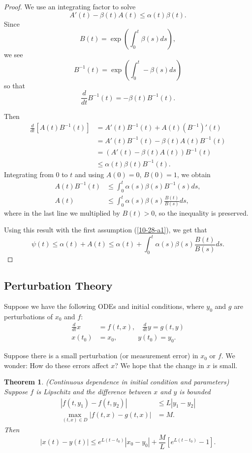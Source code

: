 \documentclass{tufte-handout}
\newtheorem{thm}{Theorem}[subsection]
\theoremstyle{definition}
\begin{document}
\begin{proof}
	We use an integrating factor to solve
	\[
		A'(t) - \beta(t) A(t) \le \alpha(t)\beta(t).
	\]
	Since \[
		B(t) = \exp\left(\int_{0}^{t} \beta(s)ds\right) 
	,\] we see
	\[
		B^{-1}(t) = \exp\left( \int_{0}^{t} -\beta(s)ds \right)
	\]
	so that
	\[
		\frac{d}{dt} B^{-1}(t) = -\beta(t) B^{-1}(t).
	\]

	Then
	\begin{align*}
		\frac{d}{dt}\left[ A(t) B^{-1}(t) \right]
			&= A'(t) B^{-1}(t) + A(t)\left( B^{-1} \right)'(t) \\
			&= A'(t) B^{-1}(t) - \beta(t) A(t) B^{-1}(t) \\
			&= \left( A'(t) - \beta(t) A(t) \right) B^{-1}(t) \\
			&\le \alpha(t)\beta(t) B^{-1}(t).
	\end{align*}
	Integrating from $0$ to $t$ and using $A(0) = 0$, $B(0) = 1$, we obtain 
	\begin{align*}
		A(t) B^{-1}(t)
			&\le \int_{0}^{t} \alpha(s)\beta(s) B^{-1}(s)ds, \\
		A(t)
			&\le \int_{0}^{t} \alpha(s)\beta(s) \frac{B(t)}{B(s)}ds,
	\end{align*}
	where in the last line we multiplied by $B(t) > 0$, so the inequality is preserved.

	Using this result with the first assumption (\ref{10-28-a1}), we get that \[
		\psi(t) \le \alpha(t) + A(t) \le \alpha(t) + \int_{0}^{t} \alpha(s)\beta(s) \frac{B(t)}{B(s)}ds 
	.\] 
\end{proof}

\subsection{Perturbation Theory}

Suppose we have the following ODEs and initial conditions, where $y_0$ and $g$ are perturbations of $x_0$ and $f$:
\begin{align*}
	\frac{d}{dt}x &= f(t,x), \quad \frac{d}{dt} y = g(t,y) \\
	x(t_0) &= x_0, \qquad \quad y(t_0) = y_0
.\end{align*}

Suppose there is a small perturbation (or measurement error) in $x_0$ or $f$. We wonder: How do these errors affect $x$? We hope that the change in $x$ is small.

\begin{thm}
	(Continuous dependence in initial condition and parameters) 
	Suppose $f$ is Lipschitz and the difference between $x$ and $y$ is bounded
	\begin{align}
		\left| f(t,y_1) - f(t,y_2) \right| &\le L \left| y_1-y_2 \right| \label{10-28-a21} \\
		\max_{(t,x) \in D} \left| f(t,x) - g(t,x) \right| &= M \label{10-28-a22}.
	\end{align}
	Then \[
		\left| x(t) - y(t) \right| \le e^{L(t-t_0)} \left| x_0-y_0 \right| + \frac{M}{L} \left[ e^{L(t-t_0)} - 1 \right] 
	.\] 
\end{thm}
\end{document}

